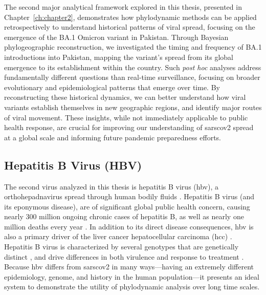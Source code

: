 The second major analytical framework explored in this thesis, presented in Chapter~\ref{ch:chapter2}, demonstrates how phylodynamic methods can be applied retrospectively to understand historical patterns of viral spread, focusing on the emergence of the BA.1 Omicron variant in Pakistan.
Through Bayesian phylogeographic reconstruction, we investigated the timing and frequency of BA.1 introductions into Pakistan, mapping the variant's spread from its global emergence to its establishment within the country.
Such \textit{post hoc} analyses address fundamentally different questions than real-time surveillance, focusing on broader evolutionary and epidemiological patterns that emerge over time.
By reconstructing these historical dynamics, we can better understand how viral variants establish themselves in new geographic regions, and identify major routes of viral movement.
These insights, while not immediately applicable to public health response, are crucial for improving our understanding of \gls{sarscov2} spread at a global scale and informing future pandemic preparedness efforts.

\subsection{Hepatitis B Virus (HBV)}
The second virus analyzed in this thesis is hepatitis B virus (\gls{hbv}), a orthohepadnavirus spread through human bodily fluids \citep{seeger2000hepatitis}.
Hepatitis B virus (and its eponymous disease), are of significant global public health concern, causing nearly 300 million ongoing chronic cases of hepatitis B, as well as nearly one million deaths every year \citep{revill2020evolution}.
In addition to its direct disease consequences, \gls{hbv} is also a primary driver of the liver cancer hepatocellular carcinoma (\gls{hcc}) \citep{levrero2016mechanisms}.
Hepatitis B virus is characterized by several genotypes that are genetically distinct \citep{lin2017natural}, and drive differences in both virulence and response to treatment \citep{kao2000hepatitis}.
Because \gls{hbv} differs from \gls{sarscov2} in many ways---having an extremely different epidemiology, genome, and history in the human population---it presents an ideal system to demonstrate the utility of phylodynamic analysis over long time scales.

